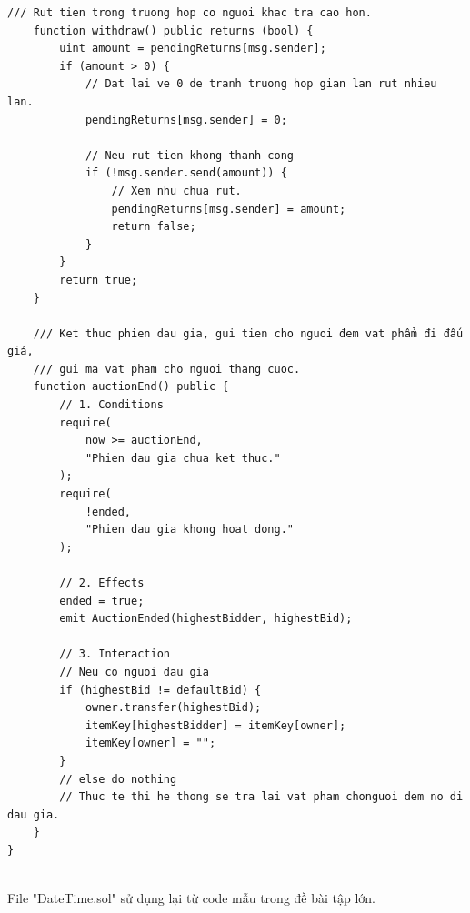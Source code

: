 \documentclass[a4paper]{article}
\begin{document}
\begin{frame}
\begin{lstlisting}[language = Solidity]
    /// Rut tien trong truong hop co nguoi khac tra cao hon.
    function withdraw() public returns (bool) {
        uint amount = pendingReturns[msg.sender];
        if (amount > 0) {
            // Dat lai ve 0 de tranh truong hop gian lan rut nhieu lan.
            pendingReturns[msg.sender] = 0;
            
            // Neu rut tien khong thanh cong
            if (!msg.sender.send(amount)) {
                // Xem nhu chua rut.
                pendingReturns[msg.sender] = amount;
                return false;
            }
        }
        return true;
    }

    /// Ket thuc phien dau gia, gui tien cho nguoi đem vat phẩm đi đấu giá,
    /// gui ma vat pham cho nguoi thang cuoc.
    function auctionEnd() public {
        // 1. Conditions
        require(
            now >= auctionEnd, 
            "Phien dau gia chua ket thuc."
        );
        require(
            !ended, 
            "Phien dau gia khong hoat dong."
        );

        // 2. Effects
        ended = true;
        emit AuctionEnded(highestBidder, highestBid);

        // 3. Interaction
        // Neu co nguoi dau gia
        if (highestBid != defaultBid) {
            owner.transfer(highestBid);
            itemKey[highestBidder] = itemKey[owner];
            itemKey[owner] = "";
        }
        // else do nothing
        // Thuc te thi he thong se tra lai vat pham chonguoi dem no di dau gia.
    }
}
\end{lstlisting}
\end{frame}\\

File "DateTime.sol" sử dụng lại từ code mẫu trong đề bài tập lớn.
\end{document}
